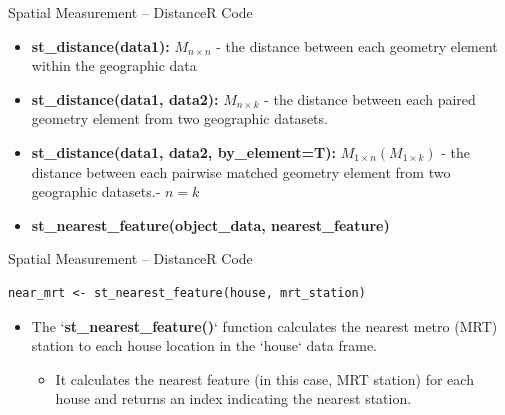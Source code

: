 \documentclass[dvipsnames,hyperref={pdfpagelabels=false}]{beamer}
\begin{document}
\begin{frame}{Spatial Measurement -- Distance}{R Code}


\small

\begin{itemize}
	\item \textbf{st\_distance(data1):} $M_{n \times n}$
	- the distance between each geometry element within the geographic data
			\vspace{0.2cm}
	\item \textbf{st\_distance(data1, data2):} $M_{n \times k}$
	- the distance between each paired geometry element from two geographic datasets.
			\vspace{0.2cm}
	\item \textbf{st\_distance(data1, data2, by\_element=T):} $M_{1 \times n}(M_{1 \times k})$
	- the distance between each pairwise matched geometry element from two geographic datasets.- $n = k$
			\vspace{0.2cm}
	\item \textbf{st\_nearest\_feature(object\_data, nearest\_feature)}
\end{itemize}
\end{frame}


\begin{frame}[fragile]{Spatial Measurement -- Distance}{R Code}
\begin{lstlisting}
near_mrt <- st_nearest_feature(house, mrt_station)
\end{lstlisting}

\begin{itemize}
	\item The `\textbf{st\_nearest\_feature()}` function calculates the nearest metro (MRT) station to each house location in the `house` data frame.
	\vspace{0.2cm}
	\begin{itemize}
		\item It calculates the nearest feature (in this case, MRT station) for each house and returns an index indicating the nearest station.
	\end{itemize}
\end{itemize}
\end{frame}
\end{document}
